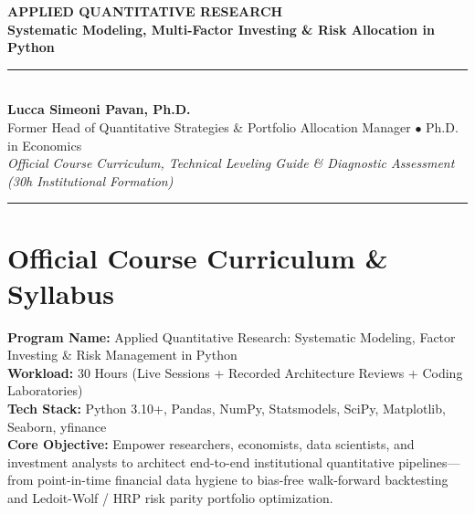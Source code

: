 \documentclass[11pt,a4paper]{article}
\begin{document}
\begin{center}
    {\Huge \textbf{\color{primarynavy} APPLIED QUANTITATIVE RESEARCH}}\\[6pt]
    {\Large \textbf{\color{accentblue} Systematic Modeling, Multi-Factor Investing \& Risk Allocation in Python}}\\[10pt]
    \rule{\textwidth}{1.5pt}\\[8pt]
    {\normalsize \textbf{Lucca Simeoni Pavan, Ph.D.}}\\
    {\small Former Head of Quantitative Strategies \& Portfolio Allocation Manager $\bullet$ Ph.D. in Economics}\\
    {\small \textit{Official Course Curriculum, Technical Leveling Guide \& Diagnostic Assessment (30h Institutional Formation)}}\\[4pt]
    \rule{\textwidth}{0.8pt}
\end{center}

\vspace{10pt}

\section{Official Course Curriculum \& Syllabus}

\begin{infobox}
\textbf{Program Name:} Applied Quantitative Research: Systematic Modeling, Factor Investing \& Risk Management in Python\\
\textbf{Workload:} 30 Hours (Live Sessions + Recorded Architecture Reviews + Coding Laboratories)\\
\textbf{Tech Stack:} Python 3.10+, Pandas, NumPy, Statsmodels, SciPy, Matplotlib, Seaborn, yfinance\\
\textbf{Core Objective:} Empower researchers, economists, data scientists, and investment analysts to architect end-to-end institutional quantitative pipelines---from point-in-time financial data hygiene to bias-free walk-forward backtesting and Ledoit-Wolf / HRP risk parity portfolio optimization.
\end{infobox}
\end{document}
